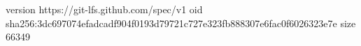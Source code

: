 version https://git-lfs.github.com/spec/v1
oid sha256:3dc697074efadcadf904f0193d79721c727e323fb888307e6fac0f6026323e7e
size 66349
